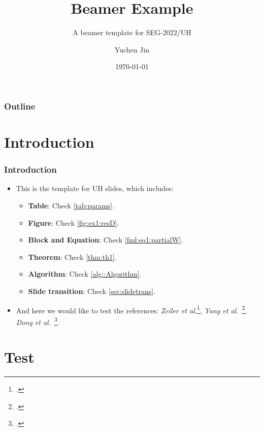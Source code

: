 \documentclass[aspectratio=169,hyperref={implicit=true}]{beamer}
\title[Demo]{Beamer Example}
\author{Yuchen Jin}
\subtitle{A beamer template for SEG-2022/UH}
\date{\today} %
\institute[Department of ECE]{University of Houston\\Department of ECE}
\begin{document}
\titleframe

\begin{frame}

\frametitle{Outline}
\tableofcontents[currentsection]

\end{frame}

\section{Introduction}

\begin{frame}
  
\frametitle{Introduction}

\begin{itemize}
  \item This is the template for UH slides, which includes:
  \begin{itemize}
    \item \textbf{Table}: Check \cref{tab:params}.
    \item \textbf{Figure}: Check \cref{fig:ex1:resD}.
    \item \textbf{Block and Equation}: Check \eqref{fml:eq1:partialW}.
    \item \textbf{Theorem}: Check \cref{thm:th1}.
    \item \textbf{Algorithm}: Check \cref{alg::Algorithm}.
    \item \textbf{Slide transition}: Check \cref{sec:slidetrans}.
  \end{itemize}
  \item And here we would like to test the references: \textit{Zeiler et al.}\footcite{Zeiler5539957}, \textit{Yang et al.}~\footcite{Yang6175956}, \textit{Dong et al.}~\footcite{Dong7115171}.
\end{itemize}

\end{frame}

\section{Test}
\end{document}
